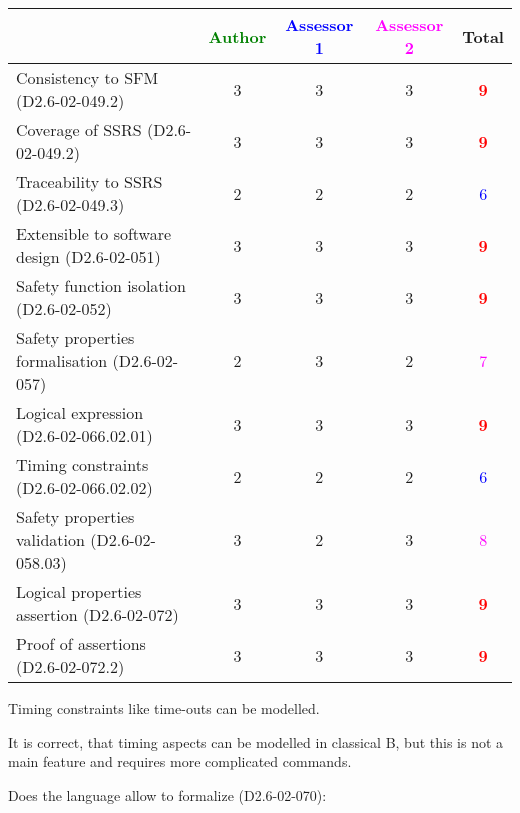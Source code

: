 \begin{tabular}{|l | c | c | c | c|}
\hline
& \textcolor{green}{Author} & \textcolor{blue}{Assessor 1} & \textcolor{magenta}{Assessor 2} & Total \\
\hline 
Consistency to SFM (D2.6-02-049.2) & 3    & 3    & 3    & \textcolor{red}{\textbf{9}} \\
\hline
Coverage of SSRS (D2.6-02-049.2)  & 3    & 3    & 3    & \textcolor{red}{\textbf{9}} \\
\hline
Traceability to  SSRS (D2.6-02-049.3)  & 2    & 2    & 2    & \textcolor{blue}{6} \\
\hline
Extensible to software design (D2.6-02-051)  & 3    & 3    & 3    & \textcolor{red}{\textbf{9}} \\
\hline
Safety function isolation (D2.6-02-052)  & 3    & 3    & 3    & \textcolor{red}{\textbf{9}} \\
\hline 
Safety properties formalisation (D2.6-02-057)  & 2    & 3    & 2    & \textcolor{magenta}{7} \\
\hline
Logical expression (D2.6-02-066.02.01)  & 3    & 3    & 3    & \textcolor{red}{\textbf{9}} \\
\hline
Timing constraints (D2.6-02-066.02.02)  & 2    & 2    & 2    & \textcolor{blue}{6} \\
\hline
Safety properties validation (D2.6-02-058.03)  & 3    & 2    & 3    & \textcolor{magenta}{8} \\
\hline
Logical properties assertion (D2.6-02-072)  & 3    & 3    & 3    & \textcolor{red}{\textbf{9}} \\
\hline
Proof of assertions (D2.6-02-072.2)  & 3    & 3    & 3    & \textcolor{red}{\textbf{9}} \\
\hline
\end{tabular}



\begin{author_comment}
Timing constraints like time-outs can be modelled.
\end{author_comment}


\begin{assessor2}
It is correct, that timing aspects can be modelled in classical B, but this is not a main feature and requires more complicated commands.
\end{assessor2}

Does the language allow to  formalize (D2.6-02-070):

